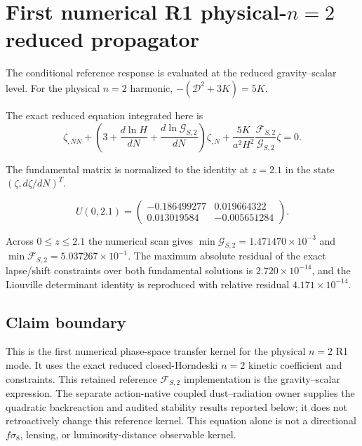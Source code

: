 \section{First numerical R1 physical-$n=2$ reduced propagator}
\label{sec:r1-n2-reduced-propagator}

The conditional reference response is evaluated at the reduced gravity--scalar level. For the physical $n=2$ harmonic, $-(\mathcal D^2+3K)=5K$.

The exact reduced equation integrated here is
\begin{equation}
\boxed{
\zeta_{,NN}
+\left(3+\frac{d\ln H}{dN}+\frac{d\ln\mathcal G_{S,2}}{dN}\right)\zeta_{,N}
+\frac{5K}{a^2H^2}\frac{\mathcal F_{S,2}}{\mathcal G_{S,2}}\zeta=0.
}
\end{equation}

The fundamental matrix is normalized to the identity at $z=2.1$ in the state $(\zeta,d\zeta/dN)^T$.

\begin{equation}
U(0,2.1)=
\begin{pmatrix}
-0.186499277 & 0.019664322\\
0.013019584 & -0.005651284
\end{pmatrix}.
\end{equation}

Across $0\le z\le2.1$ the numerical scan gives $\min\mathcal G_{S,2}=1.471470\times10^{-3}$ and $\min\mathcal F_{S,2}=5.037267\times10^{-1}$.
The maximum absolute residual of the exact lapse/shift constraints over both fundamental solutions is $2.720\times10^{-14}$, and the Liouville determinant identity is reproduced with relative residual $4.171\times10^{-14}$.

\subsection{Claim boundary}
This is the first numerical phase-space transfer kernel for the physical $n=2$ R1 mode.  It uses the exact reduced closed-Horndeski $n=2$ kinetic coefficient and constraints.
This retained reference $\mathcal F_{S,2}$ implementation is the gravity--scalar expression. The separate action-native coupled dust--radiation owner supplies the quadratic backreaction and audited stability results reported below; it does not retroactively change this reference kernel. This equation alone is not a directional $f\sigma_8$, lensing, or luminosity-distance observable kernel.
